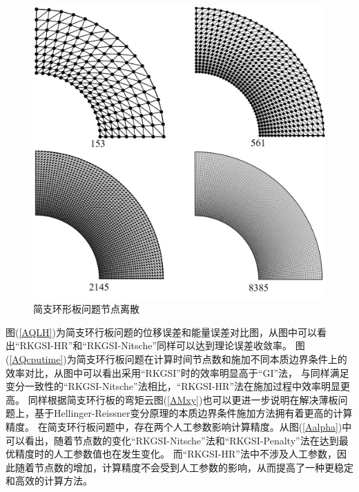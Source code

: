 \begin{figure}[H]
    \centering
    \includegraphics[scale=0.4]{figure/PHR/A/annularmsh.png}
    \caption{简支环形板问题节点离散}\label{annularmsh}
\end{figure}
图(\ref{AQLH})为简支环行板问题的位移误差和能量误差对比图，从图中可以看出“RKGSI-HR”和“RKGSI-Nitsche”同样可以达到理论误差收敛率。
图(\ref{AQcputime})为简支环行板问题在计算时间节点数和施加不同本质边界条件上的效率对比，从图中可以看出采用“RKGSI”时的效率明显高于“GI”法，
与同样满足变分一致性的“RKGSI-Nitsche”法相比，“RKGSI-HR”法在施加过程中效率明显更高。
同样根据简支环行板的弯矩云图(\ref{AMxy})也可以更进一步说明在解决薄板问题上，基于Hellinger-Reissner变分原理的本质边界条件施加方法拥有着更高的计算精度。
在简支环行板问题中，存在两个人工参数影响计算精度。从图(\ref{Aalpha})中可以看出，随着节点数的变化“RKGSI-Nitsche”法和“RKGSI-Penalty”法在达到最优精度时的人工参数值也在发生变化。
而“RKGSI-HR”法中不涉及人工参数，因此随着节点数的增加，计算精度不会受到人工参数的影响，从而提高了一种更稳定和高效的计算方法。
